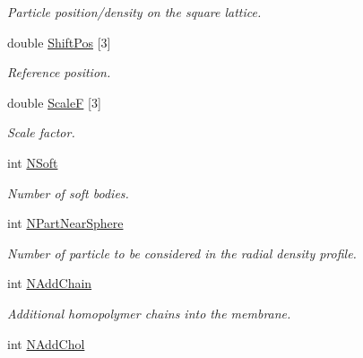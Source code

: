 \begin{DoxyCompactItemize}
\begin{DoxyCompactList}\small\item\em Particle position/density on the square lattice. \end{DoxyCompactList}\item 
double \hyperlink{classVarData_aa2dd0176f89991418fa38a24db3f3381}{Shift\+Pos} \mbox{[}3\mbox{]}\hypertarget{classVarData_aa2dd0176f89991418fa38a24db3f3381}{}\label{classVarData_aa2dd0176f89991418fa38a24db3f3381}

\begin{DoxyCompactList}\small\item\em Reference position. \end{DoxyCompactList}\item 
double \hyperlink{classVarData_a4666508bbc27ca92b693e20b16098f5a}{ScaleF} \mbox{[}3\mbox{]}\hypertarget{classVarData_a4666508bbc27ca92b693e20b16098f5a}{}\label{classVarData_a4666508bbc27ca92b693e20b16098f5a}

\begin{DoxyCompactList}\small\item\em Scale factor. \end{DoxyCompactList}\item 
int \hyperlink{classVarData_ae0d12816cef7153d2571b58556787c41}{N\+Soft}\hypertarget{classVarData_ae0d12816cef7153d2571b58556787c41}{}\label{classVarData_ae0d12816cef7153d2571b58556787c41}

\begin{DoxyCompactList}\small\item\em Number of soft bodies. \end{DoxyCompactList}\item 
int \hyperlink{classVarData_a03ba725564e3ec3787c04a1bf5f33205}{N\+Part\+Near\+Sphere}\hypertarget{classVarData_a03ba725564e3ec3787c04a1bf5f33205}{}\label{classVarData_a03ba725564e3ec3787c04a1bf5f33205}

\begin{DoxyCompactList}\small\item\em Number of particle to be considered in the radial density profile. \end{DoxyCompactList}\item 
int \hyperlink{classVarData_a0c86b9608b9e1386759ad483130f8b34}{N\+Add\+Chain}\hypertarget{classVarData_a0c86b9608b9e1386759ad483130f8b34}{}\label{classVarData_a0c86b9608b9e1386759ad483130f8b34}

\begin{DoxyCompactList}\small\item\em Additional homopolymer chains into the membrane. \end{DoxyCompactList}\item 
int \hyperlink{classVarData_a115c0b70a52bddaf28fc27d2e78cfeba}{N\+Add\+Chol}\hypertarget{classVarData_a115c0b70a52bddaf28fc27d2e78cfeba}{}\label{classVarData_a115c0b70a52bddaf28fc27d2e78cfeba}


\end{DoxyCompactItemize}
